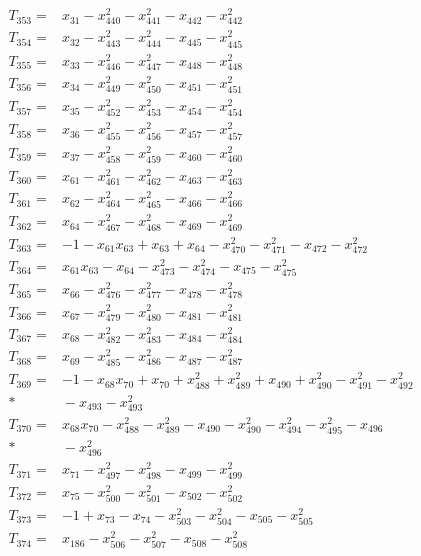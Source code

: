 \begin{align*}
T_{353}={}&x_{31}-x_{440}^{2}-x_{441}^{2}-x_{442}-x_{442}^{2}\\[3pt]
T_{354}={}&x_{32}-x_{443}^{2}-x_{444}^{2}-x_{445}-x_{445}^{2}\\[3pt]
T_{355}={}&x_{33}-x_{446}^{2}-x_{447}^{2}-x_{448}-x_{448}^{2}\\[3pt]
T_{356}={}&x_{34}-x_{449}^{2}-x_{450}^{2}-x_{451}-x_{451}^{2}\\[3pt]
T_{357}={}&x_{35}-x_{452}^{2}-x_{453}^{2}-x_{454}-x_{454}^{2}\\[3pt]
T_{358}={}&x_{36}-x_{455}^{2}-x_{456}^{2}-x_{457}-x_{457}^{2}\\[3pt]
T_{359}={}&x_{37}-x_{458}^{2}-x_{459}^{2}-x_{460}-x_{460}^{2}\\[3pt]
T_{360}={}&x_{61}-x_{461}^{2}-x_{462}^{2}-x_{463}-x_{463}^{2}\\[3pt]
T_{361}={}&x_{62}-x_{464}^{2}-x_{465}^{2}-x_{466}-x_{466}^{2}\\[3pt]
T_{362}={}&x_{64}-x_{467}^{2}-x_{468}^{2}-x_{469}-x_{469}^{2}\\[3pt]
T_{363}={}&-1-x_{61}x_{63}+x_{63}+x_{64}-x_{470}^{2}-x_{471}^{2}-x_{472}-x_{472}^{2}\\[3pt]
T_{364}={}&x_{61}x_{63}-x_{64}-x_{473}^{2}-x_{474}^{2}-x_{475}-x_{475}^{2}\\[3pt]
T_{365}={}&x_{66}-x_{476}^{2}-x_{477}^{2}-x_{478}-x_{478}^{2}\\[3pt]
T_{366}={}&x_{67}-x_{479}^{2}-x_{480}^{2}-x_{481}-x_{481}^{2}\\[3pt]
T_{367}={}&x_{68}-x_{482}^{2}-x_{483}^{2}-x_{484}-x_{484}^{2}\\[3pt]
T_{368}={}&x_{69}-x_{485}^{2}-x_{486}^{2}-x_{487}-x_{487}^{2}\\[3pt]
T_{369}={}&-1-x_{68}x_{70}+x_{70}+x_{488}^{2}+x_{489}^{2}+x_{490}+x_{490}^{2}-x_{491}^{2}-x_{492}^{2}\\*
&{}-x_{493}-x_{493}^{2}\\[3pt]
T_{370}={}&x_{68}x_{70}-x_{488}^{2}-x_{489}^{2}-x_{490}-x_{490}^{2}-x_{494}^{2}-x_{495}^{2}-x_{496}\\*
&{}-x_{496}^{2}\\[3pt]
T_{371}={}&x_{71}-x_{497}^{2}-x_{498}^{2}-x_{499}-x_{499}^{2}\\[3pt]
T_{372}={}&x_{75}-x_{500}^{2}-x_{501}^{2}-x_{502}-x_{502}^{2}\\[3pt]
T_{373}={}&-1+x_{73}-x_{74}-x_{503}^{2}-x_{504}^{2}-x_{505}-x_{505}^{2}\\[3pt]
T_{374}={}&x_{186}-x_{506}^{2}-x_{507}^{2}-x_{508}-x_{508}^{2}\\[3pt]

\end{align*}
